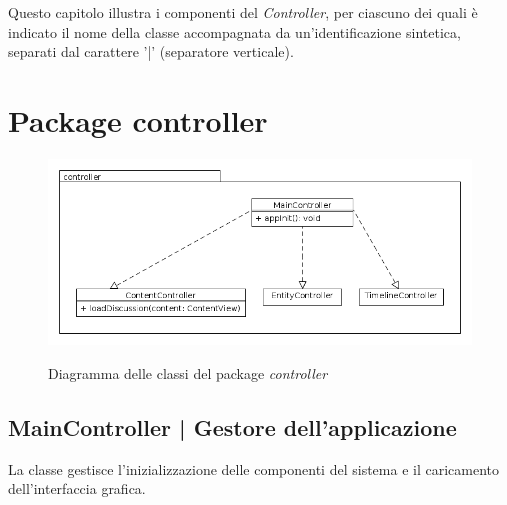\documentclass[10pt,a4paper,headinclude,footinclude,hidelinks]{scrreprt} %
\begin{document}
	Questo capitolo illustra i componenti del \textit{Controller}, per ciascuno dei quali è indicato il nome della classe accompagnata da un'identificazione sintetica, separati dal carattere '|' (separatore verticale).

	\section{Package controller}
	\label{sec:stage:design:controller}

	\begin{figure}[ht]
		\begin{center}
	    	\includegraphics[width=12cm]{class/controller.png}
			\label{gfx:class:controller}
			\caption{Diagramma delle classi del package \textit{controller}}
		\end{center}
	\end{figure}


	\subsection[MainController]{MainController | Gestore dell'applicazione}
	\label{sec:stage:design:controller:main-controller}
	La classe \textit{} gestisce l'inizializzazione delle componenti del sistema e il caricamento dell'interfaccia grafica.
\end{document}
